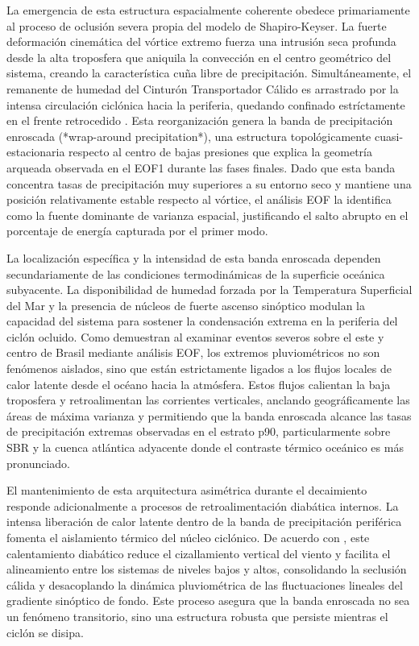 La emergencia de esta estructura espacialmente coherente obedece primariamente al proceso de oclusión severa propia del modelo de Shapiro-Keyser. La fuerte deformación cinemática del vórtice extremo fuerza una intrusión seca profunda desde la alta troposfera que aniquila la convección en el centro geométrico del sistema, creando la característica cuña libre de precipitación. Simultáneamente, el remanente de humedad del Cinturón Transportador Cálido es arrastrado por la intensa circulación ciclónica hacia la periferia, quedando confinado estríctamente en el frente retrocedido \citep{shapiro1990life, schultz2021antecedents}. Esta reorganización genera la banda de precipitación enroscada (*wrap-around precipitation*), una estructura topológicamente cuasi-estacionaria respecto al centro de bajas presiones que explica la geometría arqueada observada en el EOF1 durante las fases finales. Dado que esta banda concentra tasas de precipitación muy superiores a su entorno seco y mantiene una posición relativamente estable respecto al vórtice, el análisis EOF la identifica como la fuente dominante de varianza espacial, justificando el salto abrupto en el porcentaje de energía capturada por el primer modo.

La localización específica y la intensidad de esta banda enroscada dependen secundariamente de las condiciones termodinámicas de la superficie oceánica subyacente. La disponibilidad de humedad forzada por la Temperatura Superficial del Mar y la presencia de núcleos de fuerte ascenso sinóptico modulan la capacidad del sistema para sostener la condensación extrema en la periferia del ciclón ocluido. Como demuestran \citet{Laureanti2024relation} al examinar eventos severos sobre el este y centro de Brasil mediante análisis EOF, los extremos pluviométricos no son fenómenos aislados, sino que están estrictamente ligados a los flujos locales de calor latente desde el océano hacia la atmósfera. Estos flujos calientan la baja troposfera y retroalimentan las corrientes verticales, anclando geográficamente las áreas de máxima varianza y permitiendo que la banda enroscada alcance las tasas de precipitación extremas observadas en el estrato p90, particularmente sobre SBR y la cuenca atlántica adyacente donde el contraste térmico oceánico es más pronunciado.

El mantenimiento de esta arquitectura asimétrica durante el decaimiento responde adicionalmente a procesos de retroalimentación diabática internos. La intensa liberación de calor latente dentro de la banda de precipitación periférica fomenta el aislamiento térmico del núcleo ciclónico. De acuerdo con \citet{reboita2022from}, este calentamiento diabático reduce el cizallamiento vertical del viento y facilita el alineamiento entre los sistemas de niveles bajos y altos, consolidando la seclusión cálida y desacoplando la dinámica pluviométrica de las fluctuaciones lineales del gradiente sinóptico de fondo. Este proceso asegura que la banda enroscada no sea un fenómeno transitorio, sino una estructura robusta que persiste mientras el ciclón se disipa.

